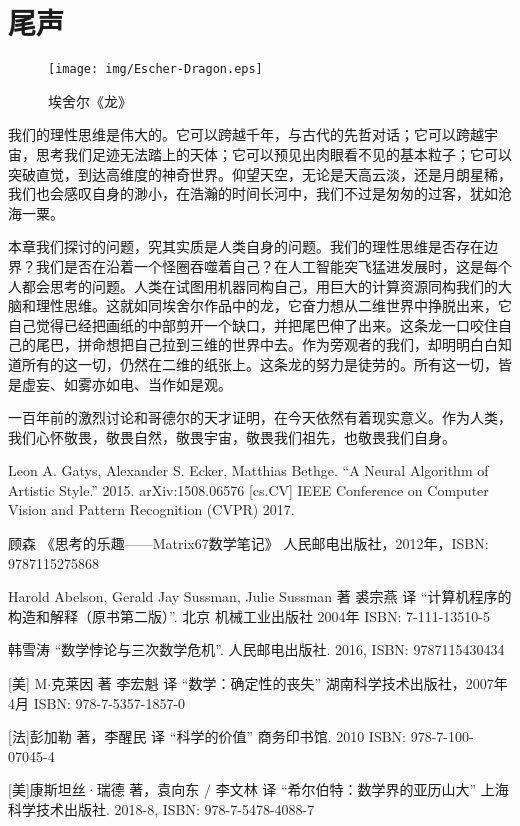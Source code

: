 \documentclass{article}
\begin{document}
\section{尾声}

\begin{wrapfigure}{R}{0.6\textwidth}
 \centering
 \texttt{[image: img/Escher-Dragon.eps]}
 \caption{埃舍尔《龙》}
 \label{fig:Escher-Dragon}
\end{wrapfigure}

我们的理性思维是伟大的。它可以跨越千年，与古代的先哲对话；它可以跨越宇宙，思考我们足迹无法踏上的天体；它可以预见出肉眼看不见的基本粒子；它可以突破直觉，到达高维度的神奇世界。仰望天空，无论是天高云淡，还是月朗星稀，我们也会感叹自身的渺小，在浩瀚的时间长河中，我们不过是匆匆的过客，犹如沧海一粟。

本章我们探讨的问题，究其实质是人类自身的问题。我们的理性思维是否存在边界？我们是否在沿着一个怪圈吞噬着自己？在人工智能突飞猛进发展时，这是每个人都会思考的问题。人类在试图用机器同构自己，用巨大的计算资源同构我们的大脑和理性思维。这就如同埃舍尔作品中的龙，它奋力想从二维世界中挣脱出来，它自己觉得已经把画纸的中部剪开一个缺口，并把尾巴伸了出来。这条龙一口咬住自己的尾巴，拼命想把自己拉到三维的世界中去。作为旁观者的我们，却明明白白知道所有的这一切，仍然在二维的纸张上。这条龙的努力是徒劳的。所有这一切，皆是虚妄、如雾亦如电、当作如是观。

一百年前的激烈讨论和哥德尔的天才证明，在今天依然有着现实意义。作为人类，我们心怀敬畏，敬畏自然，敬畏宇宙，敬畏我们祖先，也敬畏我们自身。

\ifx\wholebook\relax \else
\begin{thebibliography}{99}

Leon A. Gatys, Alexander S. Ecker, Matthias Bethge. ``A Neural Algorithm of Artistic Style.'' 2015. arXiv:1508.06576 [cs.CV] IEEE Conference on Computer Vision and Pattern Recognition (CVPR) 2017.

顾森 《思考的乐趣——Matrix67数学笔记》 人民邮电出版社，2012年，ISBN: 9787115275868

Harold Abelson, Gerald Jay Sussman, Julie Sussman 著 裘宗燕 译 ``计算机程序的构造和解释（原书第二版）''. 北京 机械工业出版社 2004年 ISBN: 7-111-13510-5

韩雪涛 ``数学悖论与三次数学危机''. 人民邮电出版社. 2016, ISBN: 9787115430434

[美] M$\cdot$克莱因 著 李宏魁 译 ``数学：确定性的丧失'' 湖南科学技术出版社，2007年4月 ISBN: 978-7-5357-1857-0

[法]彭加勒 著，李醒民 译 ``科学的价值'' 商务印书馆. 2010 ISBN: 978-7-100-07045-4

[美]康斯坦丝·瑞德 著，袁向东 / 李文林 译 ``希尔伯特：数学界的亚历山大'' 上海科学技术出版社. 2018-8, ISBN: 978-7-5478-4088-7

\end{thebibliography}

\expandafter\enddocument

\fi
\end{document}
